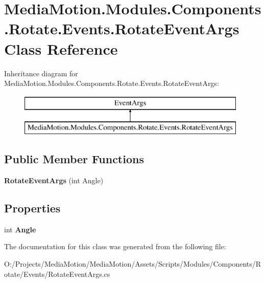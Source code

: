\hypertarget{class_media_motion_1_1_modules_1_1_components_1_1_rotate_1_1_events_1_1_rotate_event_args}{\section{Media\+Motion.\+Modules.\+Components.\+Rotate.\+Events.\+Rotate\+Event\+Args Class Reference}
\label{class_media_motion_1_1_modules_1_1_components_1_1_rotate_1_1_events_1_1_rotate_event_args}
}
Inheritance diagram for Media\+Motion.\+Modules.\+Components.\+Rotate.\+Events.\+Rotate\+Event\+Args\+:\begin{figure}[H]
\begin{center}
\leavevmode
\includegraphics[height=2.000000cm]{class_media_motion_1_1_modules_1_1_components_1_1_rotate_1_1_events_1_1_rotate_event_args}
\end{center}
\end{figure}
\subsection*{Public Member Functions}
\begin{DoxyCompactItemize}
\item 
\hypertarget{class_media_motion_1_1_modules_1_1_components_1_1_rotate_1_1_events_1_1_rotate_event_args_af1273412151f15eda964d053552a0f41}{{\bfseries Rotate\+Event\+Args} (int Angle)}\label{class_media_motion_1_1_modules_1_1_components_1_1_rotate_1_1_events_1_1_rotate_event_args_af1273412151f15eda964d053552a0f41}

\end{DoxyCompactItemize}
\subsection*{Properties}
\begin{DoxyCompactItemize}
\item 
\hypertarget{class_media_motion_1_1_modules_1_1_components_1_1_rotate_1_1_events_1_1_rotate_event_args_a31665e411e7047ccc437601c3531f845}{int {\bfseries Angle}}\label{class_media_motion_1_1_modules_1_1_components_1_1_rotate_1_1_events_1_1_rotate_event_args_a31665e411e7047ccc437601c3531f845}

\end{DoxyCompactItemize}


The documentation for this class was generated from the following file\+:\begin{DoxyCompactItemize}
\item 
O\+:/\+Projects/\+Media\+Motion/\+Media\+Motion/\+Assets/\+Scripts/\+Modules/\+Components/\+Rotate/\+Events/Rotate\+Event\+Args.\+cs\end{DoxyCompactItemize}

